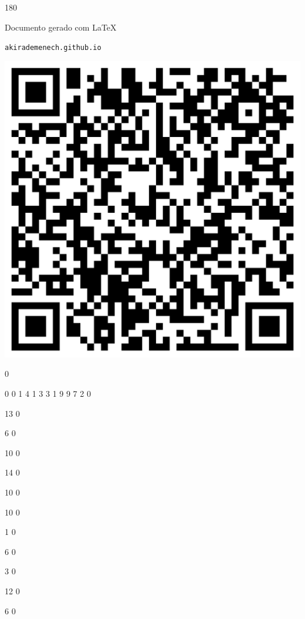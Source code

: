 \documentclass[12pt]{article}
\begin{document}
	\begin{turn}{180}	
		\begin{minipage}{\textwidth}		  
		  Documento gerado com \LaTeX			
		  
		  \texttt{akirademenech.github.io}

		  \includegraphics[height=0.3\textheight]{2e-2.pdf}

		\end{minipage}	
	\end{turn}  
		  
		\vfill  
		  
{
	0	%

	0	%
	0	%
	1	%
	4	%
	1	%
	3	%
	3	%
	1	%
	9	%
	9	%
	7	%
	2	%
	0	%

	13	%
	0	%

	6	%
	0	%

	10	%
	0	%

	14	%
	0	%

	10	%
	0	%

	10	%
	0	%

	1	%
	0	%

	6	%
	0	%

	3	%
	0	%

	12	%
	0	%

	6	%
	0	%

}	  
		    	
\end{document}

